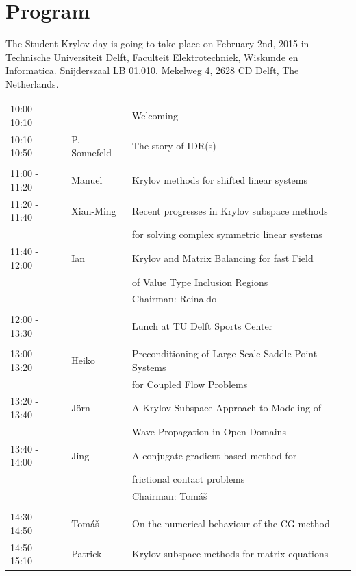 \documentclass{article}
\begin{document}
\section*{Program}
The Student Krylov day is going to take place on February 2nd, 2015 in Technische Universiteit Delft, 
    Faculteit Elektrotechniek, Wiskunde en Informatica. Snijderszaal LB 01.010.
Mekelweg 4, 2628 CD Delft, The Netherlands. \\ 
\begin{table}[h]
\begin{tabular}{lll}
10:00 - 10:10 &  & Welcoming \\ [0.5ex]
10:10 - 10:50 & P. Sonnefeld & The story of IDR(s) \\ [0.5ex]
\hline \\ [-1.5ex]
11:00 - 11:20 & Manuel & Krylov methods for shifted linear systems \\ [0.5ex]
11:20 - 11:40 & Xian-Ming & Recent progresses in Krylov subspace methods\\ 
                        & & for solving complex symmetric linear systems\\  [0.5ex]
11:40 - 12:00 & Ian & Krylov and Matrix Balancing for fast Field \\ 
              &     & of Value Type Inclusion Regions\\  [0.5ex]
& & \hfill \small{Chairman: Reinaldo }  \\
\hline \\ [-1.5ex]
12:00 - 13:30 & & Lunch at TU Delft Sports Center \\ [0.5ex]
\hline \\ [-1.5ex]
13:00 - 13:20 & Heiko & Preconditioning of Large-Scale Saddle Point Systems\\
                    & & for Coupled Flow Problems\\ [0.5ex]
13:20 - 13:40 &J\"orn & A Krylov Subspace Approach to Modeling of \\
                     & & Wave Propagation in Open Domains\\ [0.5ex]
13:40 - 14:00 & Jing & A conjugate gradient based method for \\
                   & & frictional contact problems\\ [0.5ex]
& & \hfill \small{Chairman: Tom{\'a}{\v s}} \\
\hline \\ [-1.5ex]
14:30 - 14:50 & Tom{\'a}{\v s} & On the numerical behaviour of the CG method\\ [0.5ex]
14:50 - 15:10 & Patrick & Krylov subspace methods for matrix equations \\

\end{tabular}
\end{table}
\end{document}
